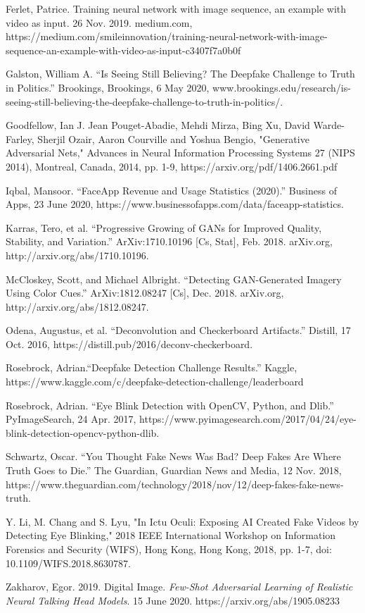 \documentclass[a4paper]{article}
\begin{document}
\begin{thebibliography}{9}
    Ferlet, Patrice. Training neural network with image sequence, an example with video as input. 26 Nov. 2019. medium.com,  https://medium.com/smileinnovation/training-neural-network-with-image-sequence-an-example-with-video-as-input-c3407f7a0b0f

    Galston, William A. “Is Seeing Still Believing? The Deepfake Challenge to Truth in Politics.” Brookings, Brookings, 6 May 2020, www.brookings.edu/research/is-seeing-still-believing-the-deepfake-challenge-to-truth-in-politics/.

    Goodfellow, Ian J. Jean Pouget-Abadie, Mehdi Mirza, Bing Xu, David Warde-Farley,
    Sherjil Ozair, Aaron Courville and Yoshua Bengio, "Generative Adversarial Nets," Advances in Neural Information Processing Systems 27 (NIPS 2014), Montreal, Canada, 2014, pp. 1-9, https://arxiv.org/pdf/1406.2661.pdf

    Iqbal, Mansoor. “FaceApp Revenue and Usage Statistics (2020).” Business of Apps, 23 June 2020, https://www.businessofapps.com/data/faceapp-statistics.

    Karras, Tero, et al. “Progressive Growing of GANs for Improved Quality, Stability, and Variation.” ArXiv:1710.10196 [Cs, Stat], Feb. 2018. arXiv.org, http://arxiv.org/abs/1710.10196.

    McCloskey, Scott, and Michael Albright. “Detecting GAN-Generated Imagery Using Color Cues.” ArXiv:1812.08247 [Cs], Dec. 2018. arXiv.org, http://arxiv.org/abs/1812.08247.

    Odena, Augustus, et al. “Deconvolution and Checkerboard Artifacts.” Distill, 17 Oct. 2016, https://distill.pub/2016/deconv-checkerboard.

    Rosebrock, Adrian.“Deepfake Detection Challenge Results.” Kaggle, https://www.kaggle.com/c/deepfake-detection-challenge/leaderboard
    
   Rosebrock, Adrian. “Eye Blink Detection with OpenCV, Python, and Dlib.” PyImageSearch, 24 Apr. 2017, https://www.pyimagesearch.com/2017/04/24/eye-blink-detection-opencv-python-dlib.
    
    Schwartz, Oscar. “You Thought Fake News Was Bad? Deep Fakes Are Where Truth Goes to Die.” The Guardian, Guardian News and Media, 12 Nov. 2018, https://www.theguardian.com/technology/2018/nov/12/deep-fakes-fake-news-truth.

    Y. Li, M. Chang and S. Lyu, "In Ictu Oculi: Exposing AI Created Fake Videos by Detecting Eye Blinking," 2018 IEEE International Workshop on Information Forensics and Security (WIFS), Hong Kong, Hong Kong, 2018, pp. 1-7, doi: 10.1109/WIFS.2018.8630787.

    Zakharov, Egor. 2019. Digital Image. \textit{Few-Shot Adversarial Learning of Realistic Neural Talking Head Models}. 15 June 2020. https://arxiv.org/abs/1905.08233

\end{thebibliography}
\end{document}
